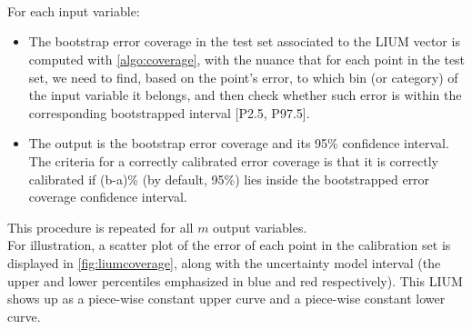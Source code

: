 \paragraph{ \\}
For each input variable:
\begin{itemize}
	\item The bootstrap error coverage in the test set associated to the LIUM vector is computed with \autoref{algo:coverage}, with the nuance that for each point in the test set, we need to find, based on the point's error, to which bin (or category) of the input variable it belongs, and then check whether such error is within the corresponding bootstrapped interval [P2.5, P97.5].
	\item The output is the bootstrap error coverage and its 95\% confidence interval. The criteria for a correctly calibrated error coverage is that it is correctly calibrated if (b-a)\% (by default, 95\%) lies inside the bootstrapped error coverage confidence interval.\\
\end{itemize}

\indent This procedure is repeated for all $m$ output variables.\\
%
\indent For illustration, a scatter plot of the error of each point in the calibration set is displayed in \autoref{fig:liumcoverage}, along with the uncertainty model interval (the upper and lower percentiles emphasized in blue and red respectively). This LIUM shows up as a piece-wise constant upper curve and a piece-wise constant lower curve.\\

